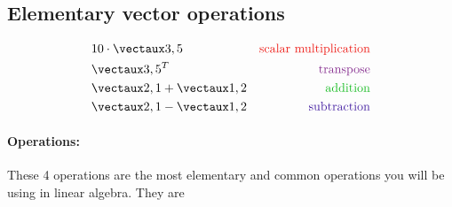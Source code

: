 \documentclass{article}
\begin{document}
\color{white}
\subsection{Elementary vector operations}
\color{black}

\begin{align*}
&10 \cdot \vect{3 , 5} & \color{rooj} \textrm{scalar multiplication} \color{black} \\ 
&\vect{3 , 5}^T  & \color{pers} \textrm{transpose} \color{black}\\ 
&\vect{2 , 1} + \vect{1 , 2} &  \color{groen} \textrm{addition}\color{black}\\
&\vect{2 , 1} - \vect{1 , 2} &  \color{blou} \textrm{subtraction}\color{black}
\end{align*}

\paragraph{Operations: } These 4 operations are the most elementary and common operations you will be using in linear algebra. They are 
\end{document}
